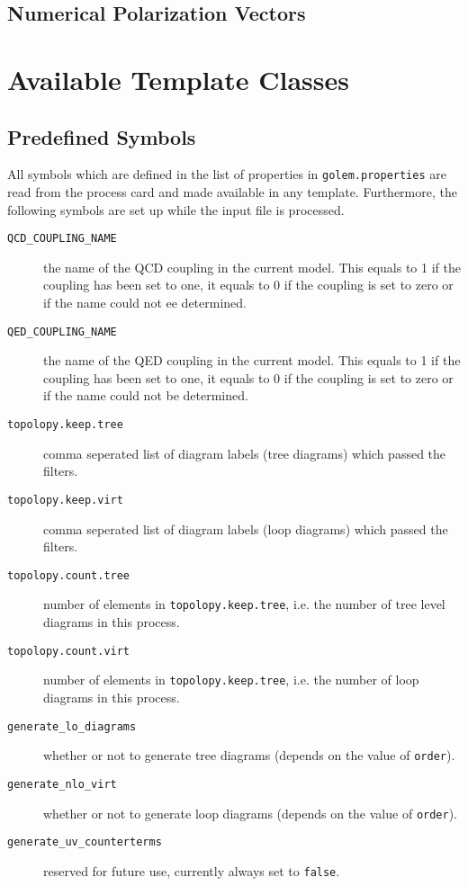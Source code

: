 \documentclass[11pt,a4paper]{refrep}
\begin{document}
\section{Numerical Polarization Vectors}

\appendix
{}
\chapter{Available Template Classes}
\label{appendix:template-classes}

\section{Predefined Symbols}
All symbols which are defined in the list of properties
in \texttt{golem.properties} are read from the process card and
made available in any template. Furthermore, the following symbols
are set up while the input file is processed.
\begin{description}
\item[\texttt{QCD\_COUPLING\_NAME}] the name of the QCD coupling in the
current model. This equals to 1 if the coupling has been set to one,
it equals to 0 if the coupling is set to zero or if the name could not
ee determined.
\item[\texttt{QED\_COUPLING\_NAME}] the name of the QED coupling in the
current model. This equals to 1 if the coupling has been set to one,
it equals to 0 if the coupling is set to zero or if the name could not
be determined.
\item[\texttt{topolopy.keep.tree}] comma seperated list of diagram labels
(tree diagrams) which passed the filters.
\item[\texttt{topolopy.keep.virt}] comma seperated list of diagram labels
(loop diagrams) which passed the filters.
\item[\texttt{topolopy.count.tree}] number of elements in
\texttt{topolopy.keep.tree}, i.e. the number of tree level diagrams in this
process.
\item[\texttt{topolopy.count.virt}] number of elements in
\texttt{topolopy.keep.tree}, i.e. the number of loop diagrams in this
process.
\item[\texttt{generate\_lo\_diagrams}] whether or not to generate tree
diagrams (depends on the value of \texttt{order}).
\item[\texttt{generate\_nlo\_virt}] whether or not to generate loop
diagrams (depends on the value of \texttt{order}).
\item[\texttt{generate\_uv\_counterterms}] reserved for future use,
currently always set to \texttt{false}.
\end{description}
\bigskip
\end{document}
